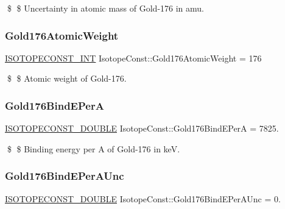 \$ \$ Uncertainty in atomic mass of Gold-\/176 in amu. \mbox{\label{group___isotope_const-_gold-_au176_gaba9eef24ffda30dec239ee4c657771ce}} 
\subsubsection{\texorpdfstring{Gold176\+Atomic\+Weight}{Gold176AtomicWeight}}
{\footnotesize\ttfamily \mbox{\hyperlink{group___isotope_const-_macros_ga5f18360b3e99483a35c32d789e62621c}{I\+S\+O\+T\+O\+P\+E\+C\+O\+N\+S\+T\+\_\+\+I\+NT}} Isotope\+Const\+::\+Gold176\+Atomic\+Weight = 176}

\$ \$ Atomic weight of Gold-\/176. \mbox{\label{group___isotope_const-_gold-_au176_gaa520b1e75f6cb431baa468dd5836e647}} 
\subsubsection{\texorpdfstring{Gold176\+Bind\+E\+PerA}{Gold176BindEPerA}}
{\footnotesize\ttfamily \mbox{\hyperlink{group___isotope_const-_macros_ga8f45a7272ce02c0b4c65c44636ed719a}{I\+S\+O\+T\+O\+P\+E\+C\+O\+N\+S\+T\+\_\+\+D\+O\+U\+B\+LE}} Isotope\+Const\+::\+Gold176\+Bind\+E\+PerA = 7825.}

\$ \$ Binding energy per A of Gold-\/176 in keV. \mbox{\label{group___isotope_const-_gold-_au176_ga6e1172362fade3f09009c6ec307e80b1}} 
\subsubsection{\texorpdfstring{Gold176\+Bind\+E\+Per\+A\+Unc}{Gold176BindEPerAUnc}}
{\footnotesize\ttfamily \mbox{\hyperlink{group___isotope_const-_macros_ga8f45a7272ce02c0b4c65c44636ed719a}{I\+S\+O\+T\+O\+P\+E\+C\+O\+N\+S\+T\+\_\+\+D\+O\+U\+B\+LE}} Isotope\+Const\+::\+Gold176\+Bind\+E\+Per\+A\+Unc = 0.}

